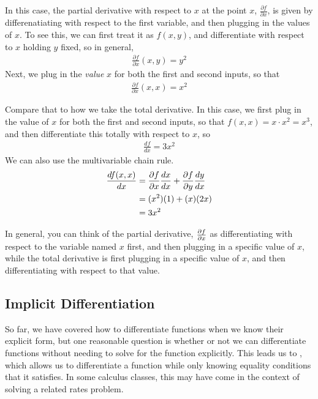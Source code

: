 In this case, the partial derivative with respect to $x$ at the point $x$, $\frac{\partial f}{\partial x}$, is given by differenatiating with respect to the first variable, and then plugging in the values of $x$. To see this, we can first treat it as $f(x, y)$, and differentiate with respect to $x$ holding $y$ fixed, so in general,
\begin{align*}
    \frac{\partial f}{\partial x}(x, y) = y^2
\end{align*}
Next, we plug in the \emph{value} $x$ for both the first and second inputs, so that
\begin{align*}
    \frac{\partial f}{\partial x}(x, x) = x^2
\end{align*}

Compare that to how we take the total derivative. In this case, we first plug in the value of $x$ for both the first and second inputs, so that $f(x, x) = x \cdot x^2 = x^3$, and then differentiate this totally with respect to $x$, so
\begin{align*}
    \frac{df}{dx} = 3x^2
\end{align*}
We can also use the multivariable chain rule.
\begin{align*}
    \frac{df(x, x)}{dx} &= \frac{\partial f}{\partial x} \frac{dx}{dx} + \frac{\partial f}{\partial y} \frac{dy}{dx} \\
    &= (x^2) (1)+ (x) (2x) \\
    &= 3x^2
\end{align*}

In general, you can think of the partial derivative, $\frac{\partial f}{\partial x}$ as differentiating with respect to the variable named $x$ first, and then plugging in a specific value of $x$, while the total derivative is first plugging in a specific value of $x$, and then differentiating with respect to that value. 

\subsection*{Implicit Differentiation}
So far, we have covered how to differentiate functions when we know their explicit form, but one reasonable question is whether or not we can differentiate functions without needing to solve for the function explicitly. This leads us to , which allows us to differentiate a function while only knowing equality conditions that it satisfies. In some calculus classes, this may have come in the context of solving a related rates problem. 


